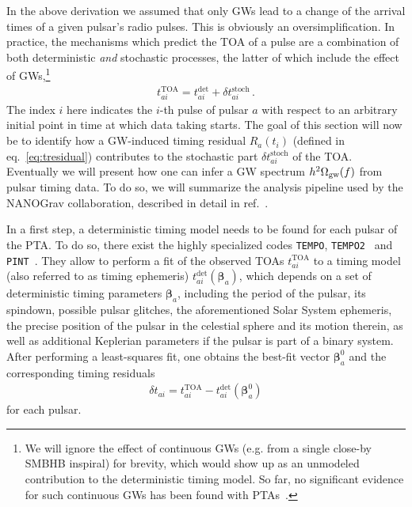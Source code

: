 In the above derivation we assumed that only \acp{GW}  lead to a change of the arrival times of a given pulsar's radio pulses. This is obviously an oversimplification. In  practice, the mechanisms which predict the \ac{TOA} of a pulse are a combination of both deterministic \textit{and} stochastic processes, the latter of which include the effect of \acp{GW},\footnote{We will ignore the effect of continuous \acp{GW} (e.g. from a single close-by \ac{SMBHB} inspiral) for brevity, which would show up as an unmodeled contribution to the deterministic timing model. So far, no significant evidence for such continuous \acp{GW} has been found with \acp{PTA}~\cite{NANOGrav:2023pdq}.} 
\begin{align}
	t_{ai}^{\text{TOA}} = t_{ai}^{\text{det}} + \delta t_{ai}^{\text{stoch}} \, . \label{eq:detstoch}
\end{align}
The index $i$ here indicates the $i$-th pulse of pulsar $a$ with respect to an arbitrary initial point in time at which data taking starts. The goal of this section will now be to identify how a \ac{GW}-induced timing residual $R_a(t_i)$ (defined in eq.~\eqref{eq:tresidual}) contributes to the stochastic part $\delta t_{ai}^{\text{stoch}}$ of the \ac{TOA}. Eventually we will present how one can infer a \ac{GW} spectrum $h^2 \Omega_{\text{gw}}(f)$ from pulsar timing data. To do so, we will summarize the analysis pipeline used by the \ac{NANOGrav} collaboration, described in detail in ref.~\cite{Taylor:2021yjx}. 

In a first step, a deterministic timing model needs to be found for each pulsar of the \ac{PTA}. To do so, there exist  the highly specialized codes \texttt{TEMPO}, \texttt{TEMPO2}~\cite{Hobbs:2006cd, Edwards:2006zg, Hobbs:2009yn} and \texttt{PINT}~\cite{Luo:2020ksx}. They allow to perform a fit of the observed \acp{TOA} $t_{ai}^{\text{TOA}}$ to a timing model (also referred to as timing ephemeris) $t_{ai}^{\text{det}}(\bm{\beta}_a)$, which depends on a set of deterministic timing parameters $\bm{\beta}_a$, including the period of the pulsar, its spindown, possible pulsar glitches, the aforementioned Solar System ephemeris, the precise position of the pulsar in the celestial sphere and its motion therein, as well as additional Keplerian parameters if the pulsar is part of a binary system. After performing a least-squares fit, one obtains the best-fit vector $\bm{\beta}_a^0$ and the corresponding timing residuals
\begin{align}
	\delta t_{ai} = t_{ai}^{\text{TOA}} - t_{ai}^{\text{det}}(\bm{\beta}_a^0) \label{eq:timingresidual}
\end{align}
for each pulsar.

